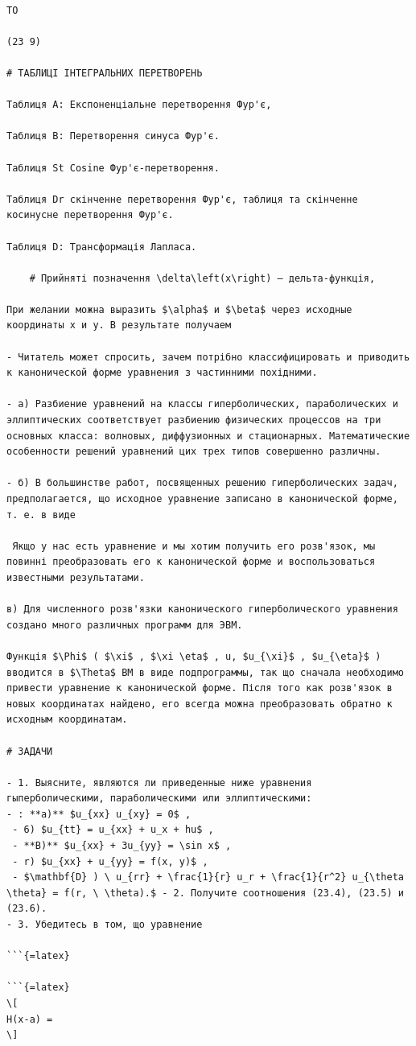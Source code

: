 \documentclass[
  ukrainian,
]{article}
\begin{document}
\begin{verbatim}

TO

(23 9)

# ТАБЛИЦІ ІНТЕГРАЛЬНИХ ПЕРЕТВОРЕНЬ

Таблиця A: Експоненціальне перетворення Фур'є,

Таблиця B: Перетворення синуса Фур'є.

Таблиця St Cosine Фур'є-перетворення.

Таблиця Dr скінченне перетворення Фур'є, таблиця та скінченне косинусне перетворення Фур'є.

Таблиця D: Трансформація Лапласа.

    # Прийняті позначення \delta\left(x\right) — дельта-функція,

При желании можна выразить $\alpha$ и $\beta$ через исходные координаты x и y. В результате получаем

- Читатель может спросить, зачем потрібно классифицировать и приводить к канонической форме уравнения з частинними похідними.

- а) Разбиение уравнений на классы гиперболических, параболических и эллиптических соответствует разбиению физических процессов на три основных класса: волновых, диффузионных и стационарных. Математические особенности решений уравнений цих трех типов совершенно различны.

- б) В большинстве работ, посвященных решению гиперболических задач, предполагается, що исходное уравнение записано в канонической форме, т. е. в виде

 Якщо у нас есть уравнение и мы хотим получить его розв'язок, мы повинні преобразовать его к канонической форме и воспользоваться известными результатами.

в) Для численного розв'язки канонического гиперболического уравнения создано много различных программ для ЭВМ.

Функція $\Phi$ ( $\xi$ , $\xi \eta$ , u, $u_{\xi}$ , $u_{\eta}$ ) вводится в $\Theta$ ВМ в виде подпрограммы, так що сначала необходимо привести уравнение к канонической форме. Після того как розв'язок в новых координатах найдено, его всегда можна преобразовать обратно к исходным координатам.

# ЗАДАЧИ

- 1. Выясните, являются ли приведенные ниже уравнения гыперболическими, параболическими или эллиптическими:
- : **a)** $u_{xx} u_{xy} = 0$ ,
 - 6) $u_{tt} = u_{xx} + u_x + hu$ ,
 - **B)** $u_{xx} + 3u_{yy} = \sin x$ ,
 - r) $u_{xx} + u_{yy} = f(x, y)$ ,
 - $\mathbf{D} ) \ u_{rr} + \frac{1}{r} u_r + \frac{1}{r^2} u_{\theta \theta} = f(r, \ \theta).$ - 2. Получите соотношения (23.4), (23.5) и (23.6).
- 3. Убедитесь в том, що уравнение

```{=latex}

```{=latex}
\[
H(x-a) =
\]
\end{verbatim}
\end{document}
